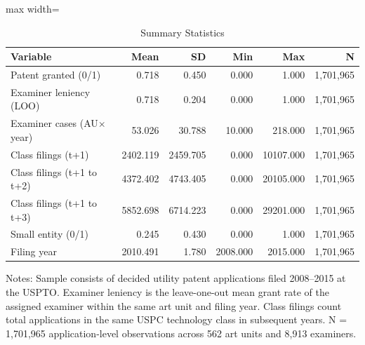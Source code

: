\begin{table}[H]
\centering
\caption{Summary Statistics}
\begin{threeparttable}
\small
\begin{adjustbox}{max width=\textwidth}
\begin{tabular}{lrrrrr}
\toprule
Variable & Mean & SD & Min & Max & N \\
\midrule
Patent granted (0/1) & 0.718 & 0.450 & 0.000 & 1.000 & 1,701,965 \\
Examiner leniency (LOO) & 0.718 & 0.204 & 0.000 & 1.000 & 1,701,965 \\
Examiner cases (AU$\times$year) & 53.026 & 30.788 & 10.000 & 218.000 & 1,701,965 \\
Class filings (t+1) & 2402.119 & 2459.705 & 0.000 & 10107.000 & 1,701,965 \\
Class filings (t+1 to t+2) & 4372.402 & 4743.405 & 0.000 & 20105.000 & 1,701,965 \\
Class filings (t+1 to t+3) & 5852.698 & 6714.223 & 0.000 & 29201.000 & 1,701,965 \\
Small entity (0/1) & 0.245 & 0.430 & 0.000 & 1.000 & 1,701,965 \\
Filing year & 2010.491 & 1.780 & 2008.000 & 2015.000 & 1,701,965 \\
\bottomrule
\end{tabular}
\end{adjustbox}
\begin{tablenotes}[flushleft]
\small
\item Notes: Sample consists of decided utility patent applications filed 2008--2015 at the USPTO. Examiner leniency is the leave-one-out mean grant rate of the assigned examiner within the same art unit and filing year. Class filings count total applications in the same USPC technology class in subsequent years. N = 1,701,965 application-level observations across 562 art units and 8,913 examiners.
\end{tablenotes}
\end{threeparttable}
\label{tab:summary}
\end{table}

